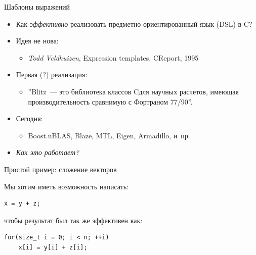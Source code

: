 \documentclass[@BEAMER_OPTIONS@]{beamer}
\newcommand{\CXX}{{\rm C}\plusplus}
\begin{document}
\note{}

\begin{frame}{Шаблоны выражений}
    \begin{itemize}
        \item Как \emph{эффективно} реализовать предметно-ориентированный язык
            (DSL) в \CXX?
            \vspace{\baselineskip}
        \item Идея не нова:
            \begin{itemize}
                \item \emph{Todd Veldhuizen}, Expression templates, \CXX Report,
                    \alert{1995}
            \end{itemize}
        \item Первая (?) реализация:
            \begin{itemize}
                \item ''Blitz\plusplus~--- это библиотека классов \CXX для
                    научных расчетов, имеющая производительность сравнимую с
                    Фортраном 77/90''.
            \end{itemize}
        \item Сегодня:
            \begin{itemize}
                \item Boost.uBLAS, Blaze, MTL, Eigen, Armadillo, и~пр.
            \end{itemize}
            \vspace{\baselineskip}
        \item \emph{Как это работает?}
    \end{itemize}
\end{frame}

\note{ }

\begin{frame}[fragile]{Простой пример: сложение векторов}
    \begin{exampleblock}{Мы хотим иметь возможность написать:}
        \begin{lstlisting}
x = y + z;
        \end{lstlisting}
    \end{exampleblock}

    \begin{exampleblock}{чтобы результат был так же эффективен как:}
        \begin{lstlisting}
for(size_t i = 0; i < n; ++i)
    x[i] = y[i] + z[i];
        \end{lstlisting}
    \end{exampleblock}
\end{frame}
\end{document}
